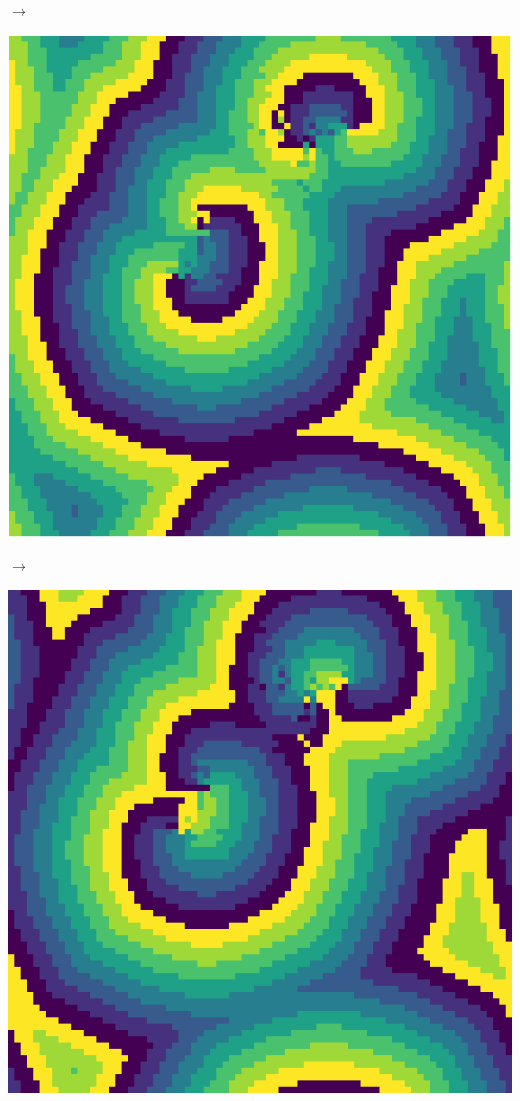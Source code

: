 \documentclass[12pt, a4paper]{article}
\begin{document}
\begin{center}
\begin{minipage}{.17\linewidth}
            \end{minipage}
            $\rightarrow$
            \begin{minipage}{.17\linewidth}
                \includegraphics[scale=0.15]{img/part2/step6.png}
            \end{minipage}
            $\rightarrow$
            \begin{minipage}{.17\linewidth}
                \includegraphics[scale=0.15]{img/part2/step7.png}

\end{minipage}
\end{center}
\end{document}
